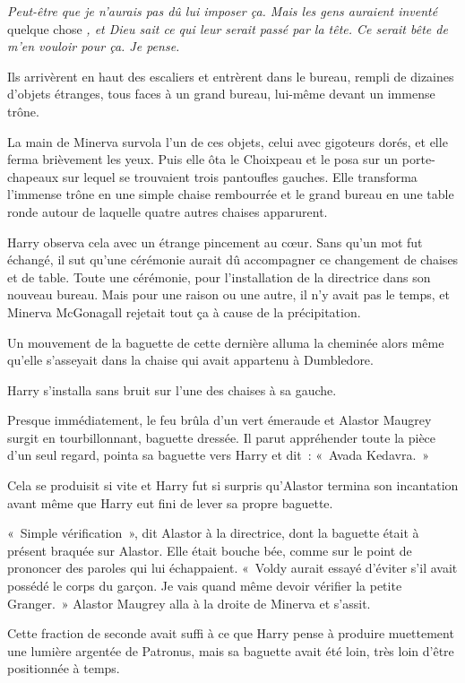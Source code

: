 \emph{Peut-être que je n'aurais pas dû lui imposer ça.
Mais les gens auraient inventé} quelque chose \emph{, et Dieu sait ce qui leur serait passé par la tête.
Ce serait bête de m'en vouloir pour ça.
Je pense.}

Ils arrivèrent en haut des escaliers et entrèrent dans le bureau, rempli de dizaines d'objets étranges, tous faces à un grand bureau, lui-même devant un immense trône.

La main de Minerva survola l'un de ces objets, celui avec gigoteurs dorés, et elle ferma brièvement les yeux.
Puis elle ôta le Choixpeau et le posa sur un porte-chapeaux sur lequel se trouvaient trois pantoufles gauches.
Elle transforma l'immense trône en une simple chaise rembourrée et le grand bureau en une table ronde autour de laquelle quatre autres chaises apparurent.

Harry observa cela avec un étrange pincement au cœur.
Sans qu'un mot fut échangé, il sut qu'une cérémonie aurait dû accompagner ce changement de chaises et de table.
Toute une cérémonie, pour l'installation de la directrice dans son nouveau bureau.
Mais pour une raison ou une autre, il n'y avait pas le temps, et Minerva McGonagall rejetait tout ça à cause de la précipitation.

Un mouvement de la baguette de cette dernière alluma la cheminée alors même qu'elle s'asseyait dans la chaise qui avait appartenu à Dumbledore.

Harry s'installa sans bruit sur l'une des chaises à sa gauche.

Presque immédiatement, le feu brûla d'un vert émeraude et Alastor Maugrey surgit en tourbillonnant, baguette dressée.
Il parut appréhender toute la pièce d'un seul regard, pointa sa baguette vers Harry et dit~: «~Avada Kedavra.~»

Cela se produisit si vite et Harry fut si surpris qu'Alastor termina son incantation avant même que Harry eut fini de lever sa propre baguette.

«~Simple vérification~», dit Alastor à la directrice, dont la baguette était à présent braquée sur Alastor.
Elle était bouche bée, comme sur le point de prononcer des paroles qui lui échappaient.
«~Voldy aurait essayé d'éviter s'il avait possédé le corps du garçon.
Je vais quand même devoir vérifier la petite Granger.~»
Alastor Maugrey alla à la droite de Minerva et s'assit.

Cette fraction de seconde avait suffi à ce que Harry pense à produire muettement une lumière argentée de Patronus, mais sa baguette avait été loin, très loin d'être positionnée à temps.

